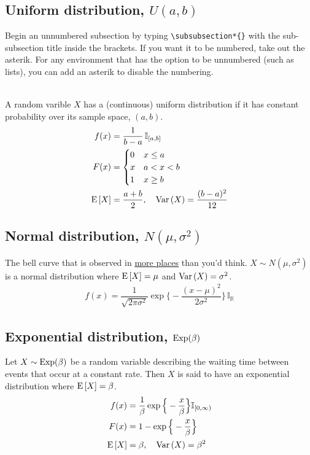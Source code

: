 \documentclass[12pt, notitlepage]{article}
\begin{document}
\subsection*{Uniform distribution, $U(a,b)$}

\begin{notes}
Begin an unnumbered subsection by typing \verb|\subsubsection*{}| with the sub-subsection title inside the brackets. If you want it to be numbered, take out the asterik. For any environment that has the option to be unnumbered (such as lists), you can add an asterik to disable the numbering. 
\end{notes}
\\

A random varible $X$ has a (continuous) uniform distribution if it has constant probability over its sample space, $(a, b)$. 
\begin{align*}
f(x) &= \dfrac{1}{b-a}\, \mathbb{I}_{[a,b]} \\
F(x) &= \begin{cases} 0 & x \leq a \\
                x & a < x < b \\
                1 & x \geq b \end{cases} \\
\mathrm{E}\,[X] &= \dfrac{a+b}{2}, \quad  \mathrm{Var}\,(X) = \dfrac{(b-a)^2}{12}
\end{align*}

\subsection*{Normal distribution, $\mathit{N}(\mu, \sigma^2)$}
The bell curve that is observed in \href{https://galtonboard.com/probabilityexamplesinlife}{more places} than you'd think. $X \sim N(\mu, \sigma^2)$ is a normal distribution where $\mathrm{E}\,[X] = \mu$ and $\mathrm{Var}\,(X) = \sigma^2$. 
\begin{align*}
f(x) = \dfrac{1}{\sqrt{2\pi \sigma^2}} \exp \Big\{ - \dfrac{(x-\mu)^2}{2\sigma^2} \Big\} \, \mathbb{I}_\mathbb{R}
\end{align*}

\subsection*{Exponential distribution, $\rm{Exp}(\beta)$}
Let $X \sim \rm{Exp}(\beta)$ be a random variable describing the waiting time between events that occur at a constant rate. Then $X$ is said to have an exponential distribution where $\mathrm{E}\,[X] = \beta$. 
\begin{align*}
f(x) &= \dfrac{1}{\beta} \exp \Big\{ - \dfrac{x}{\beta} \Big\}\mathbb{I}_{[0, \infty)} \\
F(x) & = 1 - \exp \Big\{ - \dfrac{x}{\beta} \Big\} \\
\mathrm{E}\,[X] &= \beta, \quad \mathrm{Var}\,(X) = \beta^2
\end{align*}
\end{document}
